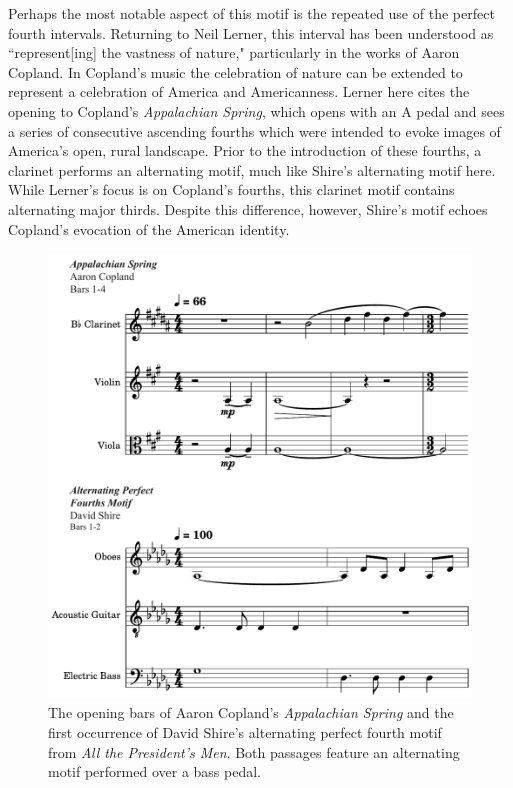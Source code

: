 Perhaps the most notable aspect of this motif is the repeated use of the perfect fourth intervals.
Returning to Neil Lerner, this interval has been understood as ``represent[ing] the vastness of nature," particularly in the works of Aaron Copland.\autocites[][503]{lerner_coplands_2001}
In Copland's music the celebration of nature can be extended to represent a celebration of America and Americanness.
Lerner here cites the opening to Copland's \textit{Appalachian Spring}, which opens with an A pedal and sees a series of consecutive ascending fourths which were intended to evoke images of America's open, rural landscape.
Prior to the introduction of these fourths, a clarinet performs an alternating motif, much like Shire's alternating motif here.
While Lerner's focus is on Copland's fourths, this clarinet motif contains alternating major thirds.
Despite this difference, however, Shire's motif echoes Copland's evocation of the American identity.
\begin{figure}
    \centering
    \includegraphics[width=1\linewidth]{img/president-fourths-appal.pdf}
    \caption{The opening bars of Aaron Copland's \textit{Appalachian Spring} and the first occurrence of David Shire's alternating perfect fourth motif from \textit{All the President's Men}. Both passages feature an alternating motif performed over a bass pedal.}
    \label{fig:president-fourths-appal}
\end{figure}


